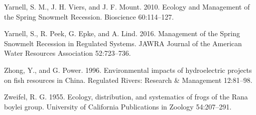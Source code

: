 \documentclass[proquest,12pt,final]{ucthesis-CA2012} %
\begin{document}
\begin{ucmainmatter}
\leavevmode\hypertarget{ref-yarnell_ecology_2010}{}%
Yarnell, S. M., J. H. Viers, and J. F. Mount. 2010. Ecology and
Management of the Spring Snowmelt Recession. Bioscience 60:114--127.

\leavevmode\hypertarget{ref-yarnell_management_2016}{}%
Yarnell, S., R. Peek, G. Epke, and A. Lind. 2016. Management of the
Spring Snowmelt Recession in Regulated Systems. JAWRA Journal of the
American Water Resources Association 52:723--736.

\leavevmode\hypertarget{ref-zhong_environmental_1996}{}%
Zhong, Y., and G. Power. 1996. Environmental impacts of hydroelectric
projects on fish resources in China. Regulated Rivers: Research \&
Management 12:81--98.

\leavevmode\hypertarget{ref-zweifel_ecology_1955}{}%
Zweifel, R. G. 1955. Ecology, distribution, and systematics of frogs of
the Rana boylei group. University of California Publications in Zoology
54:207--291.

\end{ucmainmatter}
\end{document}
